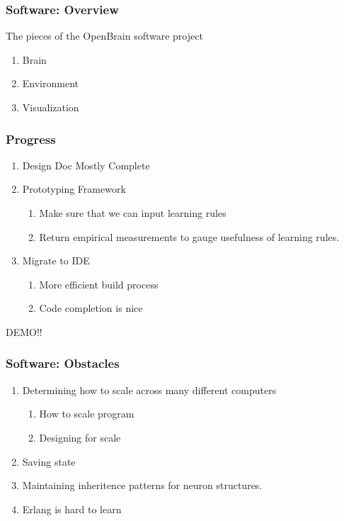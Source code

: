 \documentclass{beamer}
\begin{document}
    \begin{frame}
    	\frametitle{Software: Overview}
    	The pieces of the OpenBrain software project
	    \begin{enumerate}
          \item Brain
          \item Environment
          \item Visualization
        \end{enumerate}
    \end{frame}
    
    \begin{frame}
    	\frametitle{Progress}
        \begin{enumerate}
          
          \item Design Doc Mostly Complete
          \item Prototyping Framework
          \begin{enumerate}
              \item Make sure that we can input learning rules 	
              \item Return empirical measurements to gauge usefulness of learning rules.
          \end{enumerate}
          \item Migrate to IDE
          \begin{enumerate}
              \item More efficient build process
              \item Code completion is nice
          \end{enumerate}
		\end{enumerate}
    \end{frame}
    \begin{frame}
    \Huge{\centerline{DEMO!!}}
    \end{frame}
    \begin{frame}
    \frametitle{Software: Obstacles}
    \begin{enumerate}
    \item Determining how to scale across many different computers
    \begin{enumerate}
	    \item How to scale program
        \item Designing for scale
    \end{enumerate}
    \item Saving state
    \item Maintaining inheritence patterns for neuron structures.
    \item Erlang is hard to learn
    \end{enumerate}
    \end{frame}
   
\end{document}

